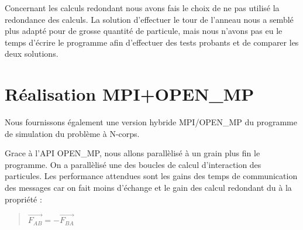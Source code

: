 \par Concernant les calculs redondant nous avons fais le choix de ne pas utilisé la redondance 
des calculs. La solution d'effectuer le tour de l'anneau nous a semblé plus adapté 
pour de grosse quantité de particule, mais nous n'avons pas eu le temps d'écrire le programme
afin d'effectuer des tests probants et de comparer les deux solutions.\\

\section{Réalisation MPI+OPEN\_MP}

\par Nous fournissons également une version hybride MPI/OPEN\_MP 
du programme de simulation du problème à N-corps.
\par Grace à l'API OPEN\_MP, nous allons parallèlisé à un grain plus fin 
le programme. On a parallèlisé une des boucles de calcul d'interaction
des particules. Les performance attendues sont les gains des temps de communication
des messages  car on fait moins d'échange et le gain des calcul redondant du 
à la propriété :

\begin{quote}
  \begin{center}
    $ \overrightarrow{F_{AB}} = -\overrightarrow{F_{BA}} $
  \end{center}
\end{quote}
